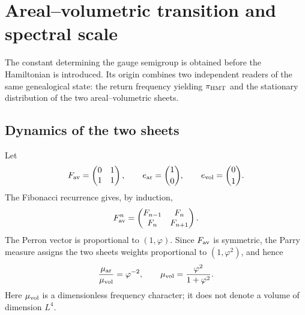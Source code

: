 \section{Areal--volumetric transition and spectral scale}
\label{sec:ym-areal-volumetric-scale}

The constant determining the gauge semigroup is obtained before the
Hamiltonian is introduced. Its origin combines two independent readers of the same
genealogical state: the return frequency yielding
\(\pi_{\rm HMT}\) and the stationary distribution of the two
areal--volumetric sheets.

\subsection{Dynamics of the two sheets}

Let
\begin{equation}
 F_{\rm av}=\begin{pmatrix}0&1\\1&1\end{pmatrix},
 \qquad e_{\rm ar}=\binom10,
 \qquad e_{\rm vol}=\binom01.
 \label{eq:ym-av-transition-matrix}
\end{equation}
The Fibonacci recurrence gives, by induction,
\begin{equation}
 F_{\rm av}^{n}
 =\begin{pmatrix}F_{n-1}&F_n\\F_n&F_{n+1}\end{pmatrix}.
 \label{eq:ym-av-fibonacci-powers}
\end{equation}
The Perron vector is proportional to \((1,\varphi)\). Since
\(F_{\rm av}\) is symmetric, the Parry measure assigns the two sheets
weights proportional to \((1,\varphi^2)\), and hence
\begin{equation}
 \frac{\mu_{\rm ar}}{\mu_{\rm vol}}=\varphi^{-2},
 \qquad
 \mu_{\rm vol}=\frac{\varphi^2}{1+\varphi^2}.
 \label{eq:ym-av-parry-weights}
\end{equation}
Here \(\mu_{\rm vol}\) is a dimensionless frequency character; it does not
denote a volume of dimension \(L^4\).

